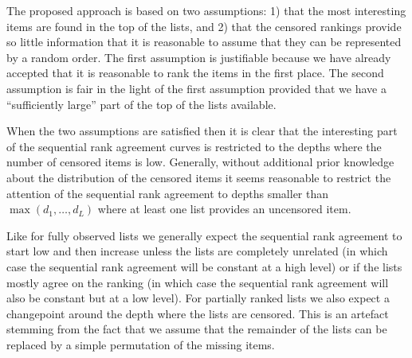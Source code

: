 \documentclass[12pt,a4paper]{article}
\theoremstyle{plain}
\begin{document}
The proposed approach is based on two assumptions: 1) that the most
interesting items are found in the top of the lists, and 2) that the
censored rankings provide so little information that it is reasonable
to assume that they can be represented by a random order. The first
assumption is justifiable because we have already accepted that it is
reasonable to rank the items in the first place. The second assumption
is fair in the light of the first assumption provided that we have a
``sufficiently large'' part of the top of the lists available.

When the two assumptions are satisfied then it is clear that the
interesting part of the sequential rank agreement curves is restricted
to the depths where the number of censored items is
low. Generally, without additional prior knowledge about the
distribution of the censored items it seems reasonable to restrict the
attention of the sequential rank agreement to depths smaller than
$\max(d_1, \ldots, d_L)$ where at least one list provides an
uncensored item.

Like for fully observed lists we generally expect the sequential rank
agreement to start low and then increase unless the lists are
completely unrelated (in which case the sequential rank agreement will
be constant at a high level) or if the lists mostly agree on the
ranking (in which case the sequential rank agreement will also be
constant but at a low level). For partially ranked lists we also
expect a changepoint around the depth where the lists are
censored. This is an artefact stemming from the fact that we assume
that the remainder of the lists can be replaced by a simple
permutation of the missing items.




\end{document}
